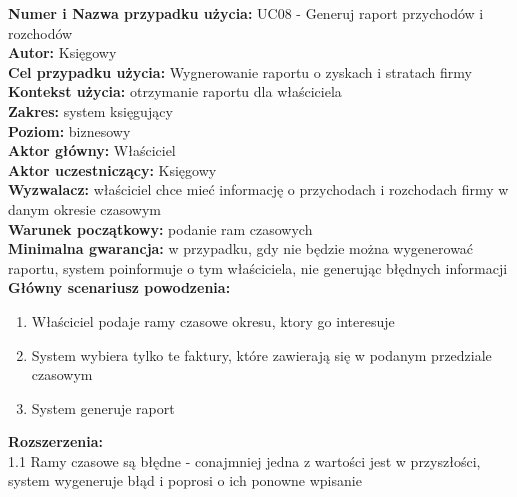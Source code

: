 \textbf{Numer i Nazwa przypadku użycia:} UC08 - Generuj raport przychodów i rozchodów \\
\textbf{Autor:} Księgowy\\
\textbf{Cel przypadku użycia:} Wygnerowanie raportu o zyskach i stratach firmy \\
\textbf{Kontekst użycia:} otrzymanie raportu dla właściciela  \\
\textbf{Zakres:} system księgujący \\
\textbf{Poziom:} biznesowy \\
\textbf{Aktor główny:} Właściciel \\
\textbf{Aktor uczestniczący:} Księgowy \\
\textbf{Wyzwalacz:} właściciel chce mieć informację o przychodach i rozchodach firmy w danym okresie czasowym \\
\textbf{Warunek początkowy:} podanie ram czasowych  \\
\textbf{Minimalna gwarancja:} w przypadku, gdy nie będzie można wygenerować raportu, system poinformuje o tym właściciela, nie generując błędnych informacji \\
\textbf{Główny scenariusz powodzenia:} 
	\begin{enumerate}
		\item Właściciel podaje ramy czasowe okresu, ktory go interesuje
		\item System wybiera tylko te faktury, które zawierają się w podanym przedziale czasowym
		\item System generuje raport
	\end{enumerate}
\textbf{Rozszerzenia:} \\
1.1 Ramy czasowe są błędne - conajmniej jedna z wartości jest w przyszłości, system wygeneruje błąd i poprosi o ich ponowne wpisanie

